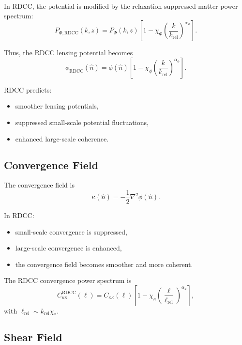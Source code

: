\documentclass[11pt,a4paper]{article}
\begin{document}
In RDCC, the potential is modified by the relaxation-suppressed matter power spectrum:
\begin{equation}
P_{\Phi,\mathrm{RDCC}}(k,z)
=
P_{\Phi}(k,z)
\left[
1
-
\chi_{\Phi}
\left(
\frac{k}{k_{\mathrm{rel}}}
\right)^{\alpha_{\Phi}}
\right].
\end{equation}

Thus, the RDCC lensing potential becomes
\begin{equation}
\phi_{\mathrm{RDCC}}(\hat{n})
=
\phi(\hat{n})
\left[
1
-
\chi_{\phi}
\left(
\frac{k}{k_{\mathrm{rel}}}
\right)^{\alpha_{\phi}}
\right].
\end{equation}

RDCC predicts:
\begin{itemize}
\item smoother lensing potentials,
\item suppressed small-scale potential fluctuations,
\item enhanced large-scale coherence.
\end{itemize}

\subsection{Convergence Field}

The convergence field is
\begin{equation}
\kappa(\hat{n})
=
-\frac{1}{2}\nabla^{2}\phi(\hat{n}).
\end{equation}

In RDCC:
\begin{itemize}
\item small-scale convergence is suppressed,
\item large-scale convergence is enhanced,
\item the convergence field becomes smoother and more coherent.
\end{itemize}

The RDCC convergence power spectrum is
\begin{equation}
C_{\kappa\kappa}^{\mathrm{RDCC}}(\ell)
=
C_{\kappa\kappa}(\ell)
\left[
1
-
\chi_{\kappa}
\left(
\frac{\ell}{\ell_{\mathrm{rel}}}
\right)^{\alpha_{\kappa}}
\right],
\end{equation}
with $\ell_{\mathrm{rel}} \sim k_{\mathrm{rel}}\chi_{*}$.

\subsection{Shear Field}
\end{document}
